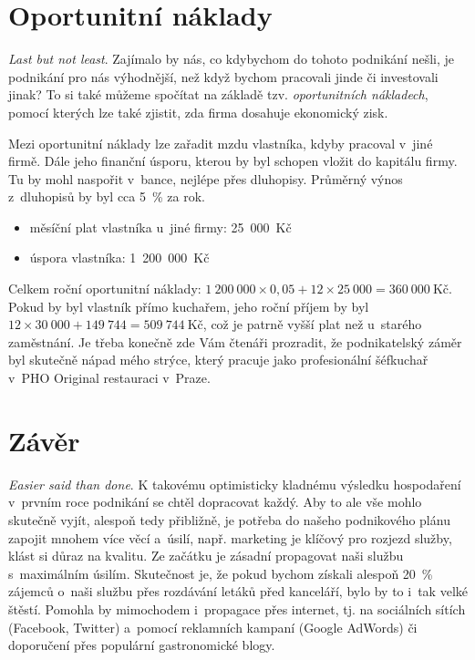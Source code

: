 \section{Oportunitní náklady}
\textit{Last but not least}. Zajímalo by nás, co kdybychom do tohoto podnikání nešli, je podnikání pro nás výhodnější, než když bychom pracovali jinde či investovali jinak? To si také můžeme spočítat na základě tzv. \textit{oportunitních nákladech}\cite{kubicek}, pomocí kterých lze také zjistit, zda firma dosahuje ekonomický zisk.

Mezi oportunitní náklady lze zařadit mzdu vlastníka, kdyby pracoval v~jiné firmě. Dále jeho finanční úsporu, kterou by byl schopen vložit do kapitálu firmy. Tu by mohl naspořit v~bance, nejlépe přes dluhopisy. Průměrný výnos z~dluhopisů by byl cca 5~\% za rok.

\begin{itemize}
\item měsíční plat vlastníka u~jiné firmy: 25~000~Kč
\item úspora vlastníka: 1~200~000~Kč
\end{itemize}

Celkem roční oportunitní náklady: $1~200~000 \times 0,05 + 12 \times 25~000 = 360~000~\text{Kč}$. Pokud by byl vlastník přímo kuchařem, jeho roční příjem by byl $12 \times 30~000 + 149~744 = 509~744~\text{Kč}$, což je patrně vyšší plat než u~starého zaměstnání. Je třeba konečně zde Vám čtenáři prozradit, že podnikatelský záměr byl skutečně nápad mého strýce, který pracuje jako profesionální šéfkuchař v~PHO Original restauraci v~Praze.

\newpage




\fancyhf{}
\pagestyle{fancy}

\section*{Závěr}
\textit{Easier said than done}. K takovému optimisticky kladnému výsledku hospodaření v~prvním roce podnikání se chtěl dopracovat každý. Aby to ale vše mohlo skutečně vyjít, alespoň tedy přibližně, je potřeba do našeho podnikového plánu zapojit mnohem více věcí a~úsilí, např. marketing je klíčový pro rozjezd služby, klást si důraz na kvalitu. Ze začátku je zásadní propagovat naši službu s~maximálním úsilím. Skutečnost je, že pokud bychom získali alespoň 20~\% zájemců o~naši službu přes rozdávání letáků před kanceláří, bylo by to i~tak velké štěstí. Pomohla by mimochodem i~propagace přes internet, tj. na sociálních sítích (Facebook, Twitter) a~pomocí reklamních kampaní (Google AdWords) či doporučení přes populární gastronomické blogy.

